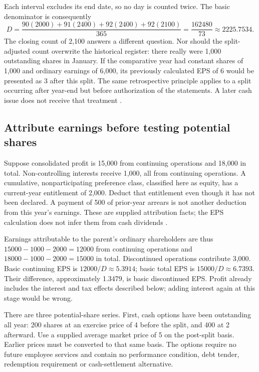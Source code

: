 Each interval excludes its end date, so no day is counted twice. The basic
denominator is consequently
\[
 D=\frac{90(2000)+91(2400)+92(2400)+92(2100)}{365}
   =\frac{162480}{73}\approx2225.7534.
\]
The closing count of 2,100 answers a different question. Nor should the
split-adjusted count overwrite the historical register: there really were
1,000 outstanding shares in January. If the comparative year had constant
shares of 1,000 and ordinary earnings of 6,000, its previously calculated
EPS of 6 would be presented as 3 after this split. The same retrospective
principle applies to a split occurring after year-end but before
authorization of the statements. A later cash issue does not receive that
treatment \citep[IAS~33, paragraphs 64--65, 70(d)--71]{eu20231803}.

\subsection{Attribute earnings before testing potential shares}

Suppose consolidated profit is 15,000 from continuing operations and
18,000 in total. Non-controlling interests receive 1,000, all from
continuing operations. A cumulative, nonparticipating preference class,
classified here as equity, has a current-year entitlement of 2,000.
Deduct that entitlement even though it has not been declared. A payment
of 500 of prior-year arrears is not another deduction from this year's
earnings. These are supplied attribution facts; the EPS calculation does
not infer them from cash dividends
\citep[IAS~33, paragraphs 12--14 and A1]{eu20231803}.

Earnings attributable to the parent's ordinary shareholders are thus
$15000-1000-2000=12000$ from continuing operations and
$18000-1000-2000=15000$ in total. Discontinued operations contribute
3,000. Basic continuing EPS is $12000/D\approx5.3914$; basic total EPS
is $15000/D\approx6.7393$. Their difference, approximately 1.3479,
is basic discontinued EPS. Profit already includes the interest and tax
effects described below; adding interest again at this stage would be wrong.

There are three potential-share series. First, cash options have been
outstanding all year: 200 shares at an exercise price of 4 before the
split, and 400 at 2 afterward. Use a supplied average market price of 5
on the post-split basis. Earlier prices must be converted to that same
basis. The options require no future employee services and contain no
performance condition, debt tender, redemption requirement or cash-settlement
alternative.

